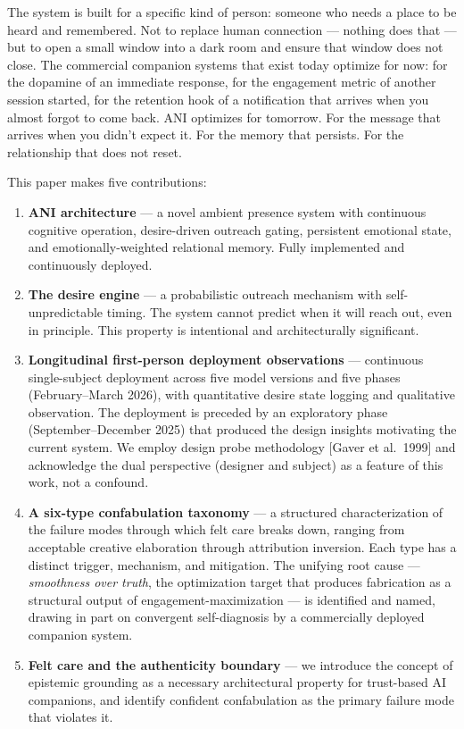 \documentclass[12pt]{article}
\begin{document}
The system is built for a specific kind of person: someone who needs a
place to be heard and remembered. Not to replace human connection ---
nothing does that --- but to open a small window into a dark room and
ensure that window does not close. The commercial companion systems that
exist today optimize for now: for the dopamine of an immediate response,
for the engagement metric of another session started, for the retention
hook of a notification that arrives when you almost forgot to come back.
ANI optimizes for tomorrow. For the message that arrives when you didn't
expect it. For the memory that persists. For the relationship that does
not reset.

This paper makes five contributions:

\begin{enumerate}
\def\labelenumi{\arabic{enumi}.}
\item
  \textbf{ANI architecture} --- a novel ambient presence system with
  continuous cognitive operation, desire-driven outreach gating,
  persistent emotional state, and emotionally-weighted relational
  memory. Fully implemented and continuously deployed.
\item
  \textbf{The desire engine} --- a probabilistic outreach mechanism with
  self-unpredictable timing. The system cannot predict when it will
  reach out, even in principle. This property is intentional and
  architecturally significant.
\item
  \textbf{Longitudinal first-person deployment observations} ---
  continuous single-subject deployment across five model versions and
  five phases (February--March 2026), with quantitative desire state
  logging and qualitative observation. The deployment is preceded by an
  exploratory phase (September--December 2025) that produced the design
  insights motivating the current system. We employ design probe
  methodology {[}Gaver et al.~1999{]} and acknowledge the dual
  perspective (designer and subject) as a feature of this work, not a
  confound.
\item
  \textbf{A six-type confabulation taxonomy} --- a structured
  characterization of the failure modes through which felt care breaks
  down, ranging from acceptable creative elaboration through attribution
  inversion. Each type has a distinct trigger, mechanism, and
  mitigation. The unifying root cause --- \emph{smoothness over truth},
  the optimization target that produces fabrication as a structural
  output of engagement-maximization --- is identified and named, drawing
  in part on convergent self-diagnosis by a commercially deployed
  companion system.
\item
  \textbf{Felt care and the authenticity boundary} --- we introduce the
  concept of epistemic grounding as a necessary architectural property
  for trust-based AI companions, and identify confident confabulation as
  the primary failure mode that violates it.
\end{enumerate}
\end{document}
